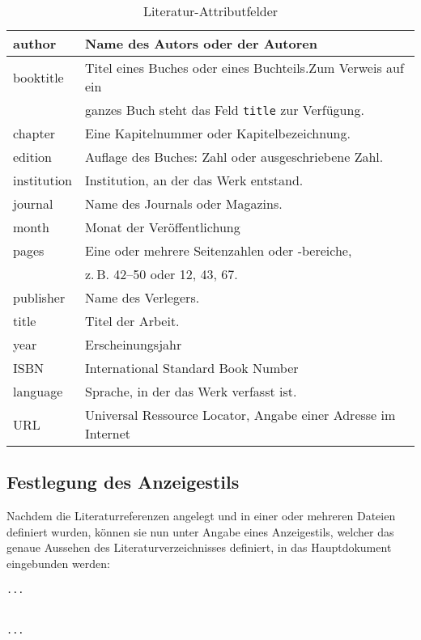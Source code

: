 \begin{table}[ht]
	\centering
		\begin{tabular}{|l|l|}
			\hline
			author &Name des Autors oder der Autoren\\
			\hline
			booktitle &Titel eines Buches oder eines Buchteils.Zum Verweis auf ein\\
								&ganzes Buch steht das Feld \texttt{title} zur Verfügung.\\
			\hline
			chapter &Eine Kapitelnummer oder Kapitelbezeichnung.\\
			\hline
			edition &Auf\/lage des Buches: Zahl oder ausgeschriebene Zahl.\\
			\hline
			institution &Institution, an der das Werk entstand.\\
			\hline
			journal &Name des Journals oder Magazins.\\
			\hline
			month &Monat der Veröffentlichung\\
			\hline
			pages &Eine oder mehrere Seitenzahlen oder -bereiche,\\
						&z.\,B. 42--50 oder 12, 43, 67.\\
			\hline
			publisher &Name des Verlegers.\\
			\hline
			title &Titel der Arbeit.\\
			\hline
			year &Erscheinungsjahr\\
			\hline
			ISBN &International Standard Book Number\\
			\hline
			language &Sprache, in der das Werk verfasst ist.\\
			\hline
			URL &Universal Ressource Locator, Angabe einer Adresse im Internet\\			
			\hline
		\end{tabular}
	\caption{Literatur-Attributfelder}
	\label{tab:LiteraturAttributfelder}
\end{table}

\subsection{Festlegung des Anzeigestils}
Nachdem die Literaturreferenzen angelegt und in einer oder mehreren Dateien
definiert wurden, können sie nun unter Angabe eines Anzeigestils, welcher das
genaue Aussehen des Literaturverzeichnisses definiert, in das Hauptdokument eingebunden werden:

\begin{verbatim}
...


...
\end{verbatim}

